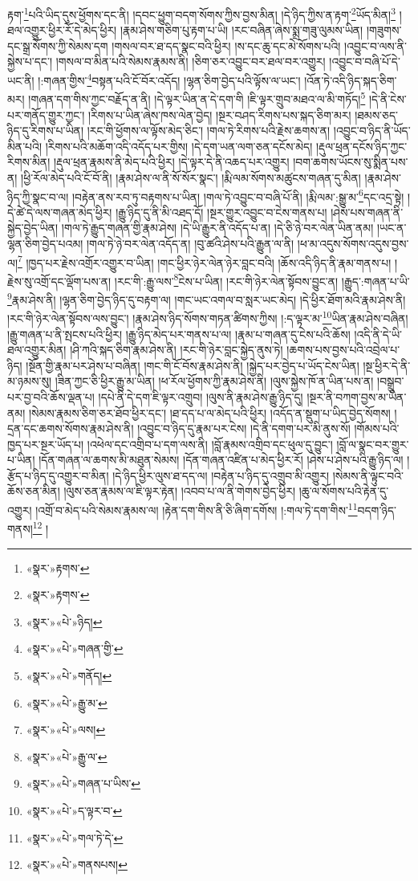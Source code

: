 རྟག་\footnote{«སྣར་»རྟགས་}པའི་ཡིད་དུས་ཕྱོགས་དང་ནི། །དབང་ཕྱུག་བདག་སོགས་ཀྱིས་བྱས་མིན། །དེ་ཉིད་ཀྱིས་ན་རྟག་\footnote{«སྣར་»རྟགས་}ཡོད་མིན།\footnote{«སྣར་»«པེ་»ཉིད།} །ཐལ་འགྱུར་ཕྱིར་རོ་དེ་མེད་ཕྱིར། །རྣམ་ཤེས་གཅིག་པུ་རྟག་པ་ཡི། །རང་བཞིན་ཞེས་སྨྲ་གཟུ་ལུམས་ཡིན། །གཟུགས་དང་སྒྲ་སོགས་ཀྱི་སེམས་དག །གསལ་བར་ཐ་དད་སྣང་བའི་ཕྱིར། །ས་དང་ཆུ་དང་མེ་སོགས་པའི། །འབྱུང་བ་ལས་ནི་སྐྱེས་པ་དང་། །གསལ་བ་མིན་པའི་སེམས་རྣམས་ནི། །ཅིག་ཅར་འབྱུང་བར་ཐལ་བར་འགྱུར། །འབྱུང་བ་བཞི་པོ་དེ་ཡང་ནི། །:གཞན་གྱིས་\footnote{«སྣར་»«པེ་»གཞན་གྱི་}བསྟན་པའི་ངོ་བོར་འདོད། །ལྷན་ཅིག་བྱེད་པའི་ལྟོས་ལ་ཡང་། །འོན་ཏེ་འདི་ཉིད་སྐད་ཅིག་མར། །གཞན་དག་གིས་ཀྱང་བརྗོད་ན་ནི། །དེ་ལྟར་ཡིན་ན་དེ་དག་གི །ཇི་ལྟར་གྲུབ་མཐའ་ལ་མི་གཏོད།\footnote{«སྣར་»«པེ་»གནོད།} །དེ་ནི་ངེས་པར་གནོད་གྱུར་ཀྱང་། །རིགས་པ་ཡིན་ཞེས་ཁས་ལེན་བྱེད། །སྔར་བཤད་རིགས་པས་སྐད་ཅིག་མར། །ཐམས་ཅད་ཉིད་དུ་རིགས་པ་ཡིན། །རང་གི་ཕྱོགས་ལ་ལྟོས་མེད་ཅིང་། །གལ་ཏེ་རིགས་པའི་རྗེས་ཆགས་ན། །འབྱུང་བ་ཉིད་ནི་ཡོད་མིན་པའི། །རིགས་པའི་མཆོག་འདི་འདོད་པར་གྱིས། །དེ་དག་ཡན་ལག་ཅན་དངོས་མེད། །རྡུལ་ཕྲན་དངོས་ཉིད་ཀྱང་རིགས་མིན། །རྡུལ་ཕྲན་རྣམས་ནི་མེད་པའི་ཕྱིར། །དེ་ལྟར་དེ་ནི་འཆད་པར་འགྱུར། །བག་ཆགས་ཡོངས་སུ་སྨིན་པས་ན། །ཕྱི་རོལ་མེད་པའི་ངོ་བོ་ནི། །རྣམ་ཤེས་ལ་ནི་སོ་སོར་སྣང་། །རྨི་ལམ་སོགས་མཚུངས་གཞན་དུ་མིན། །རྣམ་ཤེས་ཉིད་ཀྱི་སྣང་བ་ལ། །བརྟེན་ནས་རབ་ཏུ་བརྟགས་པ་ཡིན། །གལ་ཏེ་འབྱུང་བ་བཞི་པོ་ནི། །རྨི་ལམ་:སྒྱུ་མ་\footnote{«སྣར་»«པེ་»རྒྱུ་མ་}དང་འདྲ་སྟེ། །དེ་ཚེ་དེ་ལས་གཞན་མེད་ཕྱིར། །རྒྱུ་ཉིད་དུ་ནི་མི་འཐད་དོ། །སྔར་གྱུར་འབྱུང་བ་ངེས་གནས་པ། །ཤེས་པས་གཞན་ནི་སྐྱེད་བྱེད་ཡིན། །གལ་ཏེ་རྒྱུད་གཞན་གྱི་རྣམ་ཤེས། །དེ་ཡི་རྒྱུར་ནི་འདོད་པ་ན། །དེ་ཅི་ཉེ་བར་ལེན་ཡིན་ནམ། །ཡང་ན་ལྷན་ཅིག་བྱེད་པའམ། །གལ་ཏེ་ཉེ་བར་ལེན་འདོད་ན། །བུ་ཚའི་ཤེས་པའི་རྒྱུན་ལ་ནི། །ཕ་མ་འདུས་སོགས་འདུས་བྱས་ལ།\footnote{«སྣར་»«པེ་»ལས།} །ཁྱད་པར་རྗེས་འགྲོར་འགྱུར་བ་ཡིན། །གང་ཕྱིར་ཉེར་ལེན་ཉེར་བླང་བའི། །ཆོས་འདི་ཉིད་ནི་རྣམ་གནས་པ། །
རྗེས་སུ་འགྲོ་དང་ལྡོག་པས་ན། །རང་གི་:རྒྱུ་ལས་\footnote{«སྣར་»«པེ་»རྒྱུ་ལ་}ངེས་པ་ཡིན། །རང་གི་ཉེར་ལེན་སྟོབས་བྱུང་ན། །རྒྱུད་:གཞན་པ་ཡི་\footnote{«སྣར་»«པེ་»གཞན་པ་ཡིས་}རྣམ་ཤེས་ནི། །ལྷན་ཅིག་བྱེད་ཉིད་དུ་བརྟག་ལ། །གང་ཡང་འགལ་བ་སླར་ཡང་མེད། །དེ་ཕྱིར་ཐོག་མའི་རྣམ་ཤེས་ནི། །རང་གི་ཉེར་ལེན་སྟོབས་ལས་བྱུང་། །རྣམ་ཤེས་ཉིད་སོགས་གཏན་ཚིགས་ཀྱིས། །:ད་ལྟར་མ་\footnote{«སྣར་»«པེ་»ད་ལྟར་བ་}ཡིན་རྣམ་ཤེས་བཞིན། །རྒྱུ་གཞན་པ་ནི་སྤངས་པའི་ཕྱིར། །རྒྱུ་ཉིད་མེད་པར་གནས་པ་ལ། །རྣམ་པ་གཞན་དུ་ངེས་པའི་ཆོས། །འདི་ནི་དེ་ཡི་ཐལ་འགྱུར་མིན། །ཤི་ཀའི་སྐད་ཅིག་རྣམ་ཤེས་ནི། །རང་གི་ཉེར་བླང་སྐྱེད་ནུས་ཏེ། །ཆགས་པས་བྱས་པའི་འབྲེལ་པ་ཉིད། །སྔོན་གྱི་རྣམ་པར་ཤེས་པ་བཞིན། །གང་གི་ངོ་བོས་རྣམ་ཤེས་ནི། །སྐྱེད་པར་བྱེད་པ་ཡོད་ངེས་ཡིན། །སྔ་ཕྱིར་དེ་ནི་མ་ཉམས་སུ། །ཟིན་ཀྱང་ཅི་ཕྱིར་རྒྱུ་མ་ཡིན། །ཕ་རོལ་ཕྱོགས་ཀྱི་རྣམ་ཤེས་ནི། །ལུས་སྐྱེས་ཁོ་ན་ཡིན་པས་ན། །བསྒྲུབ་པར་བྱ་བའི་ཆོས་ལྡན་པ། །དཔེ་ནི་དེ་དག་ཇི་ལྟར་འགྲུབ། །ལུས་ནི་རྣམ་ཤེས་རྒྱུ་ཉིད་དུ། །སྔར་ནི་བཀག་བྱས་མ་ཡིན་ནམ། །སེམས་རྣམས་ཅིག་ཅར་ཐོབ་ཕྱིར་དང་། །ཐ་དད་པ་ལ་མེད་པའི་ཕྱིར། །འདོད་ན་སྡུག་པ་ཡིད་བྱེད་སོགས། །དྲན་དང་ཆགས་སོགས་རྣམ་ཤེས་ནི། །འབྱུང་བ་ཉིད་དུ་རྣམ་པར་ངེས། །དེ་ནི་དགག་པར་མི་ནུས་སོ། །གོམས་པའི་ཁྱད་པར་སྔར་ཡོད་པ། །འཕེལ་དང་འགྲིབ་པ་དག་ལས་ནི། །བློ་རྣམས་འགྲིབ་དང་ཕུལ་དུ་བྱུང་། །བློ་ལ་སྣང་བར་གྱུར་པ་ཡིན། །དོན་གཞན་ལ་ཆགས་མི་མཐུན་སེམས། །དོན་གཞན་འཛིན་པ་མེད་ཕྱིར་རོ། །ཤེས་པ་ཤེས་པའི་རྒྱུ་ཉིད་ལ། །རྩོད་པ་ཉིད་དུ་འགྱུར་བ་མིན། །དེ་ཉིད་ཕྱིར་ལུས་ཐ་དད་ལ། །བརྟེན་པ་ཉིད་དུ་འགྲུབ་མི་འགྱུར། །སེམས་ནི་ལྟུང་བའི་ཆོས་ཅན་མིན། །ལུས་ཅན་རྣམས་ལ་ཇི་ལྟར་རྟེན། །འབབ་པ་ལ་ནི་གེགས་བྱེད་ཕྱིར། །ཆུ་ལ་སོགས་པའི་རྟེན་དུ་འགྱུར། །འགྲོ་བ་མེད་པའི་སེམས་རྣམས་ལ། །རྟེན་དག་གིས་ནི་ཅི་ཞིག་དགོས། །:གལ་ཏེ་དག་གིས་\footnote{«སྣར་»«པེ་»གལ་ཏེ་དེ་}བདག་ཉིད་གནས།\footnote{«སྣར་»«པེ་»གནསཔས།} །
